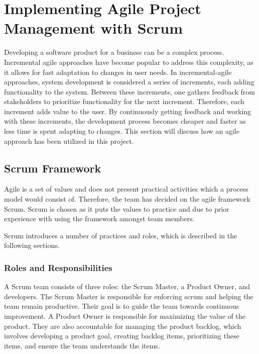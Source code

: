 \section{Implementing Agile Project Management with Scrum}
Developing a software product for a business can be a complex process.
Incremental agile approaches have become popular to address this complexity, as it allows for fast adaptation to changes in user needs. \cite{sommervilleSoftwareEngineering2016}
In incremental-agile approaches, system development is considered a series of increments, each adding functionality to the system.
Between these increments, one gathers feedback from stakeholders to prioritize functionality for the next increment.
Therefore, each increment adds value to the user.
By continuously getting feedback and working with these increments, the development process becomes cheaper and faster as less time is spent adapting to changes.\cite{sommervilleSoftwareEngineering2016}
This section will discuss how an agile approach has been utilized in this project. 

\subsection{Scrum Framework}
Agile is a set of values and does not present practical activities which a process model would consist of\cite{sutherlandScrumArtDoing2014}.
Therefore, the team has decided on the agile framework Scrum\cite{scrumdotorg}. Scrum is chosen as it puts the values to practice and due to prior experience with using the framework amongst team members. 

Scrum introduces a number of practices and roles, which is described in the following sections. 

\subsubsection*{Roles and Responsibilities}
A Scrum team consists of three roles: the Scrum Master, a Product Owner, and developers.
The Scrum Master is responsible for enforcing scrum and helping the team remain productive.
Their goal is to guide the team towards continuous improvement.
A Product Owner is responsible for maximizing the value of the product.
They are also accountable for managing the product backlog, which involves developing a product goal, creating backlog items, prioritizing these items, and ensure the team understands the items. \cite{scrumdotorg}

